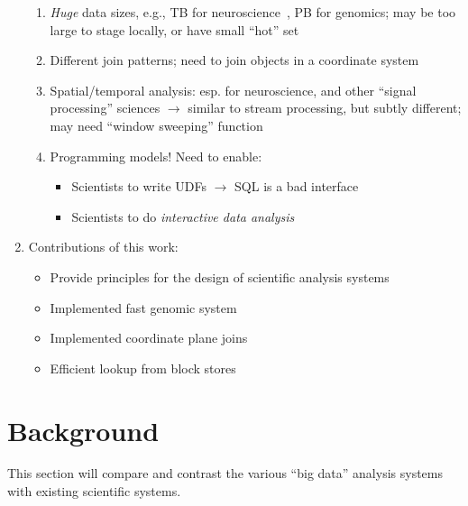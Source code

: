 \documentclass{acm_proc_article-sp}
\begin{document}
\begin{enumerate}
\begin{enumerate}
\item \emph{Huge} data sizes, e.g., TB for neuroscience~\cite{cunningham14, freeman14}, PB for
genomics; may be too large to stage locally, or have small ``hot'' set
\item Different join patterns; need to join objects in a coordinate system
\item Spatial/temporal analysis: esp. for neuroscience, and other ``signal processing'' sciences
$\rightarrow$ similar to stream processing, but subtly different; may need ``window sweeping'' function
\item Programming models! Need to enable:
\begin{itemize}
\item Scientists to write UDFs $\rightarrow$ SQL is a bad interface
\item Scientists to do \emph{interactive data analysis}
\end{itemize}
\end{enumerate}
\item Contributions of this work:
\begin{itemize}
\item Provide principles for the design of scientific analysis systems
\item Implemented fast genomic system
\item Implemented coordinate plane joins
\item Efficient lookup from block stores
\end{itemize}
\end{enumerate}

\section{Background}
\label{sec:background}

This section will compare and contrast the various ``big data'' analysis systems with existing
scientific systems.
\end{document}
